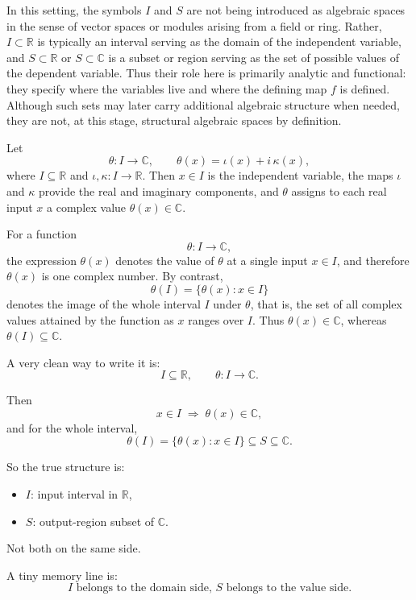 \documentclass[12pt]{article}
\begin{document}
	In this setting, the symbols \(I\) and \(S\) are not being introduced as algebraic spaces in the sense of vector spaces or modules arising from a field or ring. Rather, \(I\subset\mathbb{R}\) is typically an interval serving as the domain of the independent variable, and \(S\subset\mathbb{R}\) or \(S\subset\mathbb{C}\) is a subset or region serving as the set of possible values of the dependent variable. Thus their role here is primarily analytic and functional: they specify where the variables live and where the defining map \(f\) is defined. Although such sets may later carry additional algebraic structure when needed, they are not, at this stage, structural algebraic spaces by definition.
	
	\pagebreak
	
	Let
	$$
	\theta:I\to\mathbb{C},
	\qquad
	\theta(x)=\iota(x)+i\,\kappa(x),
	$$
	where \(I\subseteq\mathbb{R}\) and \(\iota,\kappa:I\to\mathbb{R}\). Then \(x\in I\) is the independent variable, the maps \(\iota\) and \(\kappa\) provide the real and imaginary components, and \(\theta\) assigns to each real input \(x\) a complex value \(\theta(x)\in\mathbb{C}\).
	
	For a function
	$$
	\theta:I\to\mathbb{C},
	$$
	the expression \(\theta(x)\) denotes the value of \(\theta\) at a single input \(x\in I\), and therefore \(\theta(x)\) is one complex number. By contrast,
	$$
	\theta(I)=\{\theta(x):x\in I\}
	$$
	denotes the image of the whole interval \(I\) under \(\theta\), that is, the set of all complex values attained by the function as \(x\) ranges over \(I\). Thus \(\theta(x)\in\mathbb{C}\), whereas \(\theta(I)\subseteq\mathbb{C}\).
	
	A very clean way to write it is:
	\[
	I \subseteq \mathbb{R},
	\qquad
	\theta : I \to \mathbb{C}.
	\]
	
	Then
	\[
	x \in I \;\Rightarrow\; \theta(x) \in \mathbb{C},
	\]
	and for the whole interval,
	\[
	\theta(I) = \{\theta(x) : x \in I\} \subseteq S \subseteq \mathbb{C}.
	\]
	
	So the true structure is:
	\begin{itemize}
		\item \(I\): input interval in \(\mathbb{R}\),
		\item \(S\): output-region subset of \(\mathbb{C}\).
	\end{itemize}
	
	Not both on the same side.
	
	A tiny memory line is:
	\[
	\boxed{I \text{ belongs to the domain side, } S \text{ belongs to the value side.}}
	\]
	
\end{document}
